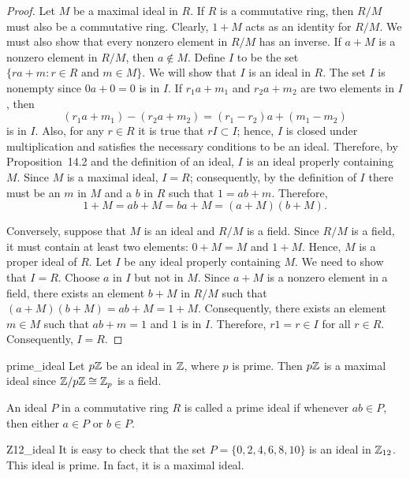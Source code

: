  
\begin{proof}
Let $M$ be a maximal ideal in $R$. If $R$ is a commutative ring, then
$R/M$ must also be a commutative ring.  Clearly, $1 + M$ acts as an
identity for $R/M$. We must also show that every nonzero element in
$R/M$ has an inverse.  If $a+M$ is a nonzero element in $R/M$, then $a
\notin M$. Define $I$ to be the set $\{ ra +m : r \in R \mbox{ and } m
\in M \}$. We will show that $I$ is an ideal in $R$. The set $I$ is
nonempty since $0a+0=0$ is in $I$. If $r_1 a +m_1$ and $r_2 a +m_2$
are two elements in $I$, then 
\[
(r_1 a + m_1) - ( r_2 a +m_2) = (r_1 - r_2)a + (m_1 -m_2)
\]
is in $I$. Also, for any $r \in R$ it is true that $rI \subset I$;
hence, $I$ is closed under multiplication and satisfies the
necessary conditions to be an ideal. Therefore, by Proposition~14.2
and the definition of an ideal, $I$ is an ideal properly containing
$M$. Since $M$ is a maximal ideal, $I=R$; consequently, by the
definition of $I$ there must be an $m$ in $M$ and a $b$ in $R$ such that
$1=ab+m$. Therefore, 
\[
1 + M = ab + M = ba + M = (a+M)(b+M).
\]
 
 
Conversely, suppose that $M$ is an ideal and $R/M$ is a field. Since
$R/M$ is a field, it must contain at least two elements: $0 + M = M$
and $1 + M$. Hence, $M$ is a proper ideal of $R$.  Let $I$ be any
ideal properly containing $M$. We need to show that $I = R$. Choose
$a$ in $I$ but not in $M$. Since $a+ M$ is a nonzero element in a
field, there exists an element $b +M$ in $R/M$ such that $(a+M)(b+M) =
ab + M = 1+M$.  Consequently, there exists an element $m \in M$ such
that $ab + m = 1$ and $1$ is in $I$. Therefore, $r1 =r \in I$ for all
$r \in R$. Consequently, $I = R$. 
\end{proof}
 
 
\begin{example}{prime_ideal}
Let $p{\Bbb Z}$ be an ideal in ${\Bbb Z}$, where $p$ is prime. Then
$p{\Bbb Z}$  is a maximal ideal since ${\Bbb Z}/ p {\Bbb Z} \cong
{\Bbb Z}_p$ is a field. 
\end{example}
  
 

 
 
An ideal $P$ in a commutative ring $R$ is called a {\bfi prime
ideal\/} if whenever $ab \in P$,
then either $a \in P$ or $b \in P$.
 
 
 
\begin{example}{Z12_ideal}
It is easy to check that the set $P = \{ 0, 2, 4, 6, 8, 10  \}$ is an
ideal in ${\Bbb Z}_{12}$. This ideal is prime. In fact, it is a
maximal ideal.
\end{example}
 
